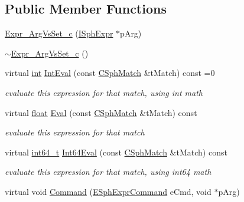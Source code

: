 \subsection*{Public Member Functions}
\begin{DoxyCompactItemize}
\item 
\hyperlink{classExpr__ArgVsSet__c_a18c06880b5537861d9ceee93c4b31770}{Expr\-\_\-\-Arg\-Vs\-Set\-\_\-c} (\hyperlink{structISphExpr}{I\-Sph\-Expr} $\ast$p\-Arg)
\item 
\hyperlink{classExpr__ArgVsSet__c_ae33ba4469631c7d994c4ab59800b5eef}{$\sim$\-Expr\-\_\-\-Arg\-Vs\-Set\-\_\-c} ()
\item 
virtual \hyperlink{sphinxexpr_8cpp_a4a26e8f9cb8b736e0c4cbf4d16de985e}{int} \hyperlink{classExpr__ArgVsSet__c_a2b37f6f558473937dff6330f7cff7897}{Int\-Eval} (const \hyperlink{classCSphMatch}{C\-Sph\-Match} \&t\-Match) const =0
\begin{DoxyCompactList}\small\item\em evaluate this expression for that match, using int math \end{DoxyCompactList}\item 
virtual \hyperlink{sphinxexpr_8cpp_a0e0d0739f7035f18f949c2db2c6759ec}{float} \hyperlink{classExpr__ArgVsSet__c_a070a899449a4b8b4e95e5c229fe7576f}{Eval} (const \hyperlink{classCSphMatch}{C\-Sph\-Match} \&t\-Match) const 
\begin{DoxyCompactList}\small\item\em evaluate this expression for that match \end{DoxyCompactList}\item 
virtual \hyperlink{sphinxstd_8h_a996e72f71b11a5bb8b3b7b6936b1516d}{int64\-\_\-t} \hyperlink{classExpr__ArgVsSet__c_a0163c31015aadea5403a4c5b01e229e7}{Int64\-Eval} (const \hyperlink{classCSphMatch}{C\-Sph\-Match} \&t\-Match) const 
\begin{DoxyCompactList}\small\item\em evaluate this expression for that match, using int64 math \end{DoxyCompactList}\item 
virtual void \hyperlink{classExpr__ArgVsSet__c_a0791a9c7034cadf422380864e1c1b8ab}{Command} (\hyperlink{sphinxexpr_8h_a30be184fb07bd80c271360fc6094c818}{E\-Sph\-Expr\-Command} e\-Cmd, void $\ast$p\-Arg)
\end{DoxyCompactItemize}
